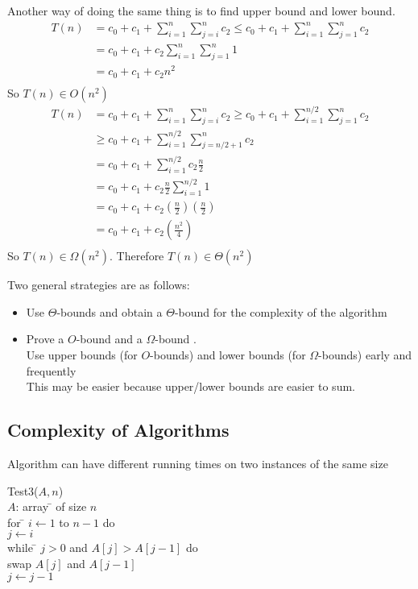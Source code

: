 \documentclass[letterpaper, 12pt]{article}
\newcommand{\red}[1]{{\color{red}{#1}}}
\begin{document}
    Another way of doing the same thing is to find upper bound and lower bound.
    \begin{align*}
        T(n) &= c_0 + c_1 + \sum_{i = 1}^n \sum_{j = i}^n c_2 \leq c_0 + c_1 + \sum_{i = 1}^n \sum_{j = 1}^n c_2\\
        &= c_0 + c_1 + c_2\sum_{i = 1}^n \sum_{j = 1}^n 1\\
        &= c_0 + c_1 + c_2n^2\\
    \end{align*}
    So $T(n) \in O(n^2)$\\
    \begin{align*}
        T(n) &= c_0 + c_1 + \sum_{i = 1}^n \sum_{j = i}^n c_2 \geq c_0 + c_1 + \sum_{i = 1}^{n/2} \sum_{j = 1}^n c_2\\
        &\geq c_0 + c_1 + \sum_{i = 1}^{n/2} \sum_{j = n/2 + 1}^n c_2\\
        &= c_0 + c_1 + \sum_{i = 1} ^{n/2}c_2\frac{n}{2}\\
        &= c_0 + c_1 + c_2\frac{n}{2}\sum_{i = 1} ^{n/2}1\\
        &= c_0 + c_1 + c_2(\frac{n}{2})(\frac{n}{2})\\
        &= c_0 + c_1 + c_2(\frac{n^2}{4})\\
    \end{align*}
    So $T(n) \in \Omega(n^2)$. Therefore $T(n) \in \Theta(n^2)$
    \bigskip

    Two general strategies are as follows:
    \begin{itemize}
        \item Use $\Theta$-bounds \red{throughout the analysis} and obtain a $\Theta$-bound for the complexity of the algorithm
        \item Prove a $O$-bound and a \red{matching} $\Omega$-bound \red{separately}.\\
        Use upper bounds (for $O$-bounds) and lower bounds (for $\Omega$-bounds) early and frequently\\
        This may be easier because upper/lower bounds are easier to sum.
    \end{itemize}
    \pagebreak

    \subsection{Complexity of Algorithms}
    Algorithm can have different running times on two instances of the same size\\
    \begin{tabbing}
        Test3($A, n$)\\
        $A$: array \= \+ of size $n$\\
            for \= \+ $i\leftarrow 1$ to $n - 1$ do\\
                $j \leftarrow i$\\
                while \= \+ $j > 0$ and $A[j] > A[j-1]$ do\\
                    swap $A[j]$ and $A[j-1]$\\
                    $j \leftarrow j - 1$\\
    \end{tabbing}
\end{document}

